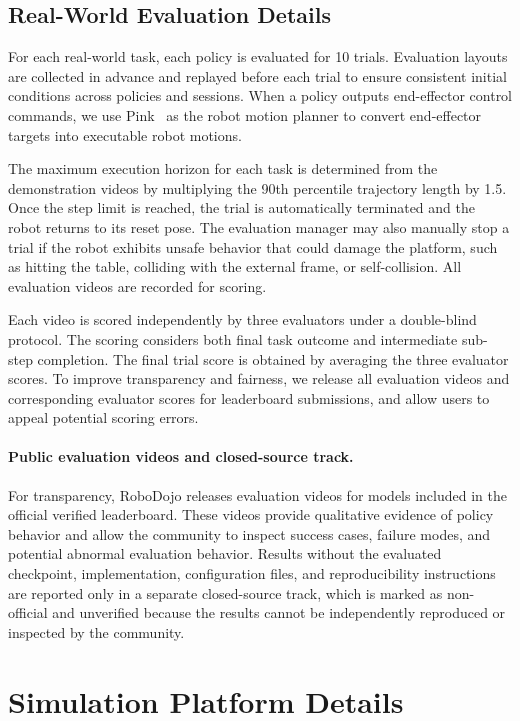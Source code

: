 \subsection{Real-World Evaluation Details}
\label{appendix:real_evaluation_setting}

For each real-world task, each policy is evaluated for 10 trials. Evaluation layouts are collected in advance and replayed before each trial to ensure consistent initial conditions across policies and sessions. When a policy outputs end-effector control commands, we use Pink~\citep{pink} as the robot motion planner to convert end-effector targets into executable robot motions.

The maximum execution horizon for each task is determined from the demonstration videos by multiplying the 90th percentile trajectory length by 1.5. Once the step limit is reached, the trial is automatically terminated and the robot returns to its reset pose. The evaluation manager may also manually stop a trial if the robot exhibits unsafe behavior that could damage the platform, such as hitting the table, colliding with the external frame, or self-collision. All evaluation videos are recorded for scoring.

Each video is scored independently by three evaluators under a double-blind protocol. The scoring considers both final task outcome and intermediate sub-step completion. The final trial score is obtained by averaging the three evaluator scores. To improve transparency and fairness, we release all evaluation videos and corresponding evaluator scores for leaderboard submissions, and allow users to appeal potential scoring errors.

\paragraph{Public evaluation videos and closed-source track.}
For transparency, RoboDojo releases evaluation videos for models included in the official verified leaderboard. These videos provide qualitative evidence of policy behavior and allow the community to inspect success cases, failure modes, and potential abnormal evaluation behavior. Results without the evaluated checkpoint, implementation, configuration files, and reproducibility instructions are reported only in a separate closed-source track, which is marked as non-official and unverified because the results cannot be independently reproduced or inspected by the community.

\section{Simulation Platform Details}
\label{appendix:simulation_platform_details}

